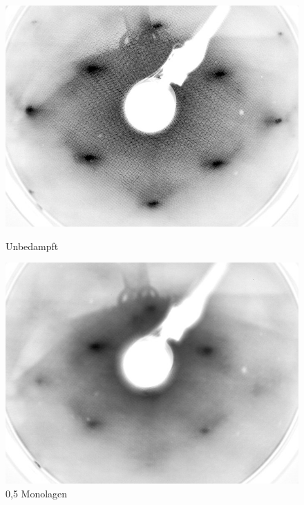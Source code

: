 
\begin{figure}[htbp]
	\begin{minipage}[b]{0.4\textwidth} 
		\includegraphics[width=\textwidth]{LEED-Bilder/bearbeitet/unbedampft_E207}
		\caption{Unbedampft}
		\label{Bild} 
	\end{minipage}
	\hfill
	\begin{minipage}[b]{0.4\textwidth}
		\includegraphics[width=\textwidth]{LEED-Bilder/bearbeitet/0_5ML_E208}
		\caption{0,5 Monolagen}
		\label{Bild} 
	\end{minipage}
	

\end{figure}
